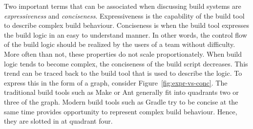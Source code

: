 \documentclass[12pt, a4paper, titlepage]{scrartcl}
\begin{document}
\par Two important terms that can be associated when discussing build systems are \emph{expressiveness} and \emph{conciseness}. Expressiveness is the capability of the build tool to describe complex build behaviour. Conciseness is when the build tool expresses the build logic in an easy to understand manner. In other words, the control flow of the build logic should be realized by the users of a team without difficulty. More often than not, these properties do not scale proportionately. When build logic tends to become complex, the conciseness of the build script decreases. This trend can be traced back to the build tool that is used to describe the logic. To express this in the form of a graph, consider Figure~\ref{fig:expr-vs-conc}. The traditional build tools such as Make or Ant generally fit into quadrants two or three of the graph. Modern build tools such as Gradle try to be concise at the same time provides opportunity to represent complex build behaviour. Hence, they are slotted in at quadrant four. 
\end{document}
